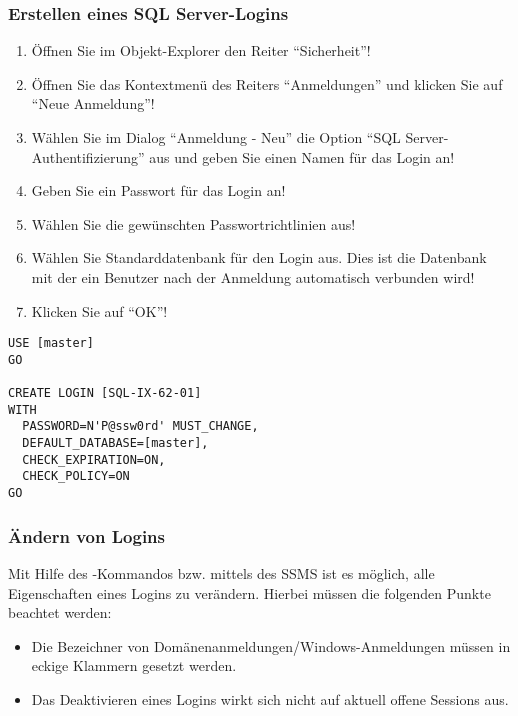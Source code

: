         \subsubsection{Erstellen eines SQL Server-Logins}
          \begin{enumerate}
            \item Öffnen Sie im Objekt-Explorer den Reiter \enquote{Sicherheit}! 
            \item Öffnen Sie das Kontextmenü des Reiters \enquote{Anmeldungen}
            und klicken Sie auf \enquote{Neue Anmeldung}!
            \item Wählen Sie im Dialog \enquote{Anmeldung - Neu} die Option
            \enquote{SQL Server-Authentifizierung} aus und geben Sie einen Namen
            für das Login an!
            \item Geben Sie ein Passwort für das Login an!
            \item Wählen Sie die gewünschten Passwortrichtlinien aus!
            \item Wählen Sie Standarddatenbank für den Login aus. Dies ist die
            Datenbank mit der ein Benutzer nach der Anmeldung automatisch
            verbunden wird!
            \item Klicken Sie auf \enquote{OK}!
          \end{enumerate}
          \begin{lstlisting}[language=ms_sql, caption={Anlegen eines SQL
          Server-Logins mit T-SQL}, label=admin19_07]
USE [master]
GO

CREATE LOGIN [SQL-IX-62-01] 
WITH 
  PASSWORD=N'P@ssw0rd' MUST_CHANGE, 
  DEFAULT_DATABASE=[master], 
  CHECK_EXPIRATION=ON, 
  CHECK_POLICY=ON
GO
        \end{lstlisting}
        \subsubsection{Ändern von Logins}
          Mit Hilfe des -Kommandos bzw. mittels
          des SSMS ist es möglich, alle Eigenschaften eines Logins zu verändern.
          Hierbei müssen die folgenden Punkte beachtet werden:
          \begin{itemize}
            \item Die Bezeichner von Domänenanmeldungen/Windows-Anmeldungen
            müssen in eckige Klammern gesetzt werden.
            \item Das Deaktivieren eines Logins wirkt sich nicht auf aktuell
            offene Sessions aus.
          \end{itemize}
          \begin{literaturinternet}
            \item \cite{ms189828}
          \end{literaturinternet}
